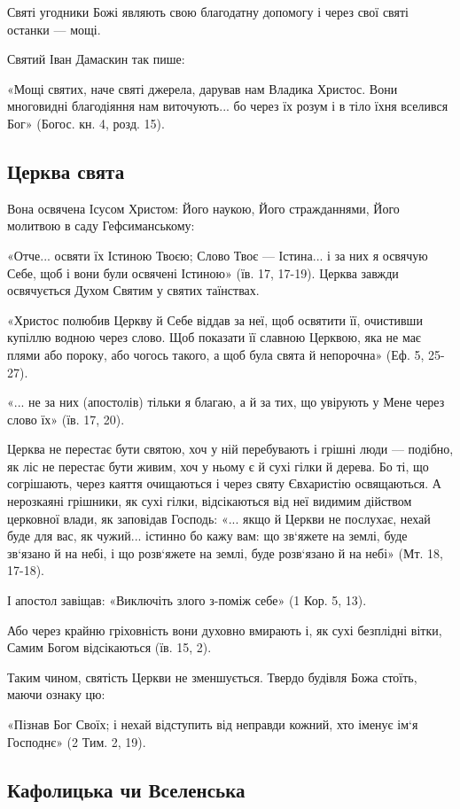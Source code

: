 \documentclass[main.tex]{subfiles}
\begin{document}
Святі угодники Божі являють свою благодатну допомогу і через свої святі останки — мощі.

Святий Іван Дамаскин так пише:

«Мощі святих, наче святі джерела, дарував нам Владика Христос. Вони многовидні благодіяння нам виточують... бо через їх розум і в тіло їхня вселився Бог» (Богос. кн. 4, розд. 15).

\subsection{Церква свята}

Вона освячена Ісусом Христом: Його наукою, Його стражданнями, Його молитвою в саду Гефсиманському:

«Отче... освяти їх Істиною Твоєю; Слово Твоє — Істина... і за них я освячую Себе, щоб і вони були освячені Істиною» (їв. 17, 17-19). Церква завжди освячується Духом Святим у святих таїнствах.

«Христос полюбив Церкву й Себе віддав за неї, щоб освятити її, очистивши купіллю водною через слово. Щоб показати її славною Церквою, яка не має плями або пороку, або чогось такого, а щоб була свята й непорочна» (Еф. 5, 25-27).

«... не за них (апостолів) тільки я благаю, а й за тих, що увірують у Мене через слово їх» (їв. 17, 20).
 
Церква не перестає бути святою, хоч у ній перебувають і грішні люди — подібно, як ліс не перестає бути живим, хоч у ньому є й сухі гілки й дерева. Бо ті, що согрішають, через каяття очищаються і через святу Євхаристію освящаються. А нерозкаяні грішники, як сухі гілки, відсікаються від неї видимим дійством церковної влади, як заповідав Господь: «... якщо й Церкви не послухає, нехай буде для вас, як чужий... істинно бо кажу вам: що зв`яжете на землі, буде зв`язано й на небі, і що розв`яжете на землі, буде розв`язано й на небі» (Мт. 18, 17-18).

І апостол завіщав: «Виключіть злого з-поміж себе» (1 Кор. 5, 13).

Або через крайню гріховність вони духовно вмирають і, як сухі безплідні вітки, Самим Богом відсікаються (їв. 15, 2).

Таким чином, святість Церкви не зменшується. Твердо будівля Божа стоїть, маючи ознаку цю:

«Пізнав Бог Своїх; і нехай відступить від неправди кожний, хто іменує ім`я Господнє» (2 Тим. 2, 19).

\subsection{Кафолицька чи Вселенська}
\end{document}
